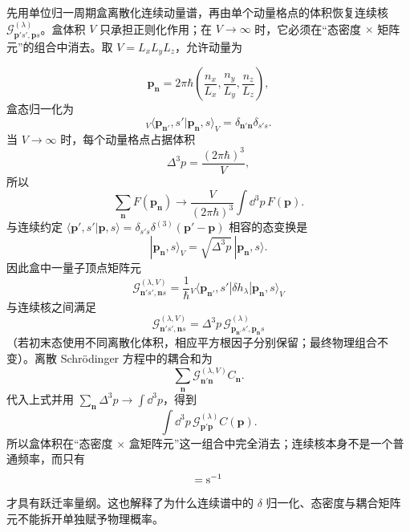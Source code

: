 \begin{derivation}
先用单位归一周期盒离散化连续动量谱，再由单个动量格点的体积恢复连续核 $\mathcal G^{(\lambda)}_{\mathbf p's',\mathbf ps}$。盒体积 $V$ 只承担正则化作用；在 $V\to\infty$ 时，它必须在“态密度 $\times$ 矩阵元”的组合中消去。取 $V=L_xL_yL_z$，允许动量为

\begin{equation*}
\mathbf p_{\mathbf n}
=2\pi\hbar\left(\frac{n_x}{L_x},\frac{n_y}{L_y},\frac{n_z}{L_z}\right),
\end{equation*}
盒态归一化为
\begin{equation*}
{}_V\!\langle\mathbf p_{\mathbf n'},s'|\mathbf p_{\mathbf n},s\rangle_V
=\delta_{\mathbf n'\mathbf n}\delta_{s's}.
\end{equation*}
当 $V\to\infty$ 时，每个动量格点占据体积
\begin{equation*}
\Delta^3p=\frac{(2\pi\hbar)^3}{V},
\end{equation*}
所以
\begin{equation*}
\sum_{\mathbf n}F(\mathbf p_{\mathbf n})
\longrightarrow
\frac{V}{(2\pi\hbar)^3}\int\dd^3 p\,F(\mathbf p).
\end{equation*}
与连续约定
$\langle\mathbf p',s'|\mathbf p,s\rangle=\delta_{s's}\delta^{(3)}(\mathbf p'-\mathbf p)$
相容的态变换是
\begin{equation*}
|\mathbf p_{\mathbf n},s\rangle_V
=\sqrt{\Delta^3p}\,|\mathbf p_{\mathbf n},s\rangle.
\end{equation*}
因此盒中一量子顶点矩阵元
\begin{equation*}
\mathcal G^{(\lambda,V)}_{\mathbf n's',\mathbf ns}
=\frac1\hbar{}_V\!\langle\mathbf p_{\mathbf n'},s'|
\delta h_\lambda|\mathbf p_{\mathbf n},s\rangle_V
\end{equation*}
与连续核之间满足
\begin{equation*}
\mathcal G^{(\lambda,V)}_{\mathbf n's',\mathbf ns}
=\Delta^3p\,
\mathcal G^{(\lambda)}_{\mathbf p_{\mathbf n'}s',\mathbf p_{\mathbf n}s}
\end{equation*}
（若初末态使用不同离散化体积，相应平方根因子分别保留；最终物理组合不变）。离散 Schr\"odinger 方程中的耦合和为
\begin{equation*}
\sum_{\mathbf n}
\mathcal G^{(\lambda,V)}_{\mathbf n'\mathbf n}C_{\mathbf n}.
\end{equation*}
代入上式并用 $\sum_{\mathbf n}\Delta^3p\to\int\dd^3 p$，得到
\begin{equation*}
\int\dd^3 p\,
\mathcal G^{(\lambda)}_{\mathbf p'\mathbf p}C(\mathbf p).
\end{equation*}
所以盒体积在“态密度 $\times$ 盒矩阵元”这一组合中完全消去；连续核本身不是一个普通频率，而只有
\begin{equation*}
[\mathcal G_{\mathbf p'\mathbf p}\,\dd^3 p]={\rm s^{-1}}
\end{equation*}
才具有跃迁率量纲。这也解释了为什么连续谱中的 $\delta$ 归一化、态密度与耦合矩阵元不能拆开单独赋予物理概率。
\end{derivation}

